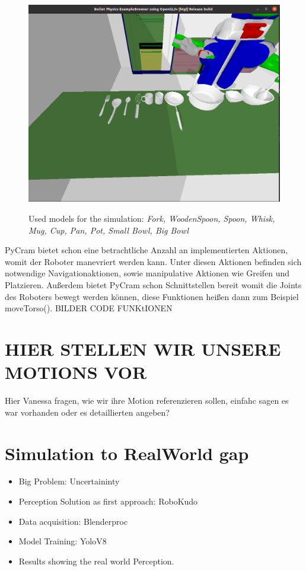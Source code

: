 \begin{figure}[H]
    \includegraphics[scale=0.35]{Graphics/toolscontainersmodels.png}
    \label{fig:toolscontainersmodels}
    \caption{Used models for the simulation: \textit{Fork, WoodenSpoon, Spoon, Whisk, Mug, Cup, Pan, Pot, Small Bowl, Big Bowl}}
\end{figure}

PyCram bietet schon eine betrachtliche Anzahl an implementierten Aktionen, womit der Roboter manevriert werden kann. 
Unter diesen Aktionen befinden sich notwendige Navigationaktionen, sowie manipulative Aktionen wie Greifen und Platzieren. 
Außerdem bietet PyCram schon Schnittstellen bereit womit die Joints des Roboters bewegt werden können, diese Funktionen heißen dann zum Beispiel moveTorso().
BILDER CODE FUNKtIONEN

\section*{HIER STELLEN WIR UNSERE MOTIONS VOR}
Hier Vanessa fragen, wie wir ihre Motion referenzieren sollen, einfahc sagen es war vorhanden oder es detaillierten angeben?

\section*{Simulation to RealWorld gap}
\begin{itemize}
	\item Big Problem: Uncertaininty
	\item Perception Solution as first approach: RoboKudo
	\item Data acquisition: Blenderproc
	\item Model Training: YoloV8
	\item Results showing the real world Perception.
\end{itemize}